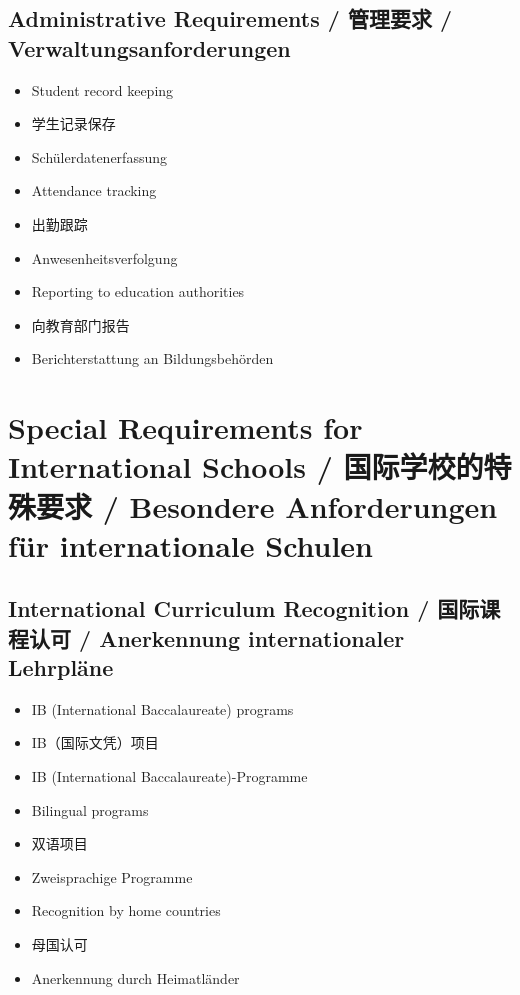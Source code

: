 \subsection{Administrative Requirements / 管理要求 / Verwaltungsanforderungen}
\begin{itemize}
    \item Student record keeping
    \item 学生记录保存
    \item Schülerdatenerfassung
    \item Attendance tracking
    \item 出勤跟踪
    \item Anwesenheitsverfolgung
    \item Reporting to education authorities
    \item 向教育部门报告
    \item Berichterstattung an Bildungsbehörden
\end{itemize}

\section{Special Requirements for International Schools / 国际学校的特殊要求 / Besondere Anforderungen für internationale Schulen}

\subsection{International Curriculum Recognition / 国际课程认可 / Anerkennung internationaler Lehrpläne}
\begin{itemize}
    \item IB (International Baccalaureate) programs
    \item IB（国际文凭）项目
    \item IB (International Baccalaureate)-Programme
    \item Bilingual programs
    \item 双语项目
    \item Zweisprachige Programme
    \item Recognition by home countries
    \item 母国认可
    \item Anerkennung durch Heimatländer
\end{itemize}

